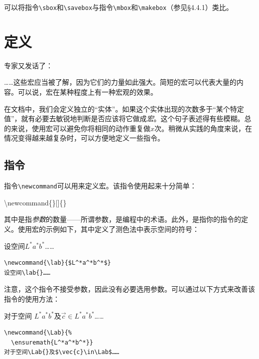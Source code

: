 可以将指令\verb|\sbox|和\verb|\savebox|与指令\verb|\mbox|和\verb|\makebox|（参见\S 4.4.1）类比。

\section{定义}

专家又发话了：

\begin{origincitation}
  ……这些宏应当被了解，因为它们的力量如此强大。简短的宏可以代表大量的内容。可以说，宏在某种程度上有一种宏观的效果。
\end{origincitation}

在文档中，我们会定义独立的``实体''。如果这个实体出现的次数多于``某个特定值''，就有必要去敏锐地判断是否应该将它做成\emph{宏}。这个句子表述得有些模糊。总的来说，使用宏可以避免你将相同的动作重复做$x$次。稍微从实践的角度来说，在情况变得越来越复杂时，可以方便地定义一些指令。

\subsection{指令}

指令\verb|\newcommand|可以用来定义宏。该指令使用起来十分简单：

\begin{dmd}
\backslash newcommand\{\}[]\{\}
\end{dmd}

其中是指\emph{参数}的数量——所谓参数，是编程中的术语。此外，是指你的指令的定义。使用宏的示例如下，其中定义了测色法中表示空间的符号：

\begin{codelist}[4.18]{
  \newcommand{\lab}{$L^*a^*b^*$}
设空间\lab{}……
}
\begin{verbatim}
\newcommand{\lab}{$L^*a^*b^*$}
设空间\lab{}……\end{verbatim}
\end{codelist}

注意，这个指令不接受参数，因此没有必要选用参数。可以通过以下方式来改善该指令的使用方法：

\begin{codelist}[4.19]{
\newcommand{\Lab}{
  \ensuremath{L^*a^*b^*}}
对于空间\Lab{}及$\vec{c}\in\Lab$……
}
\begin{verbatim}
\newcommand{\Lab}{%
  \ensuremath{L^*a^*b^*}}
对于空间\Lab{}及$\vec{c}\in\Lab$……\end{verbatim}
\end{codelist}

